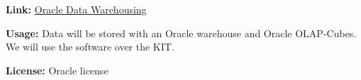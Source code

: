 \textbf{Link:} \href{http://www.oracle.com/de/technologies/datawarehousing/index.html}{Oracle Data Warehousing}

\textbf{Usage:} 
Data will be stored with an Oracle warehouse and Oracle OLAP-Cubes. We will use the software over the KIT.

\textbf{License:} Oracle license
% 
% 
% 


